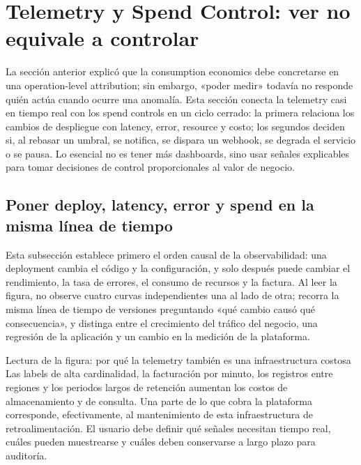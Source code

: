 \section{Telemetry y Spend Control: ver no equivale a controlar}

La sección anterior explicó que la consumption economics debe concretarse en una operation-level attribution; sin embargo, «poder medir» todavía no responde quién actúa cuando ocurre una anomalía. Esta sección conecta la telemetry casi en tiempo real con los spend controls en un ciclo cerrado: la primera relaciona los cambios de despliegue con latency, error, resource y costo; los segundos deciden si, al rebasar un umbral, se notifica, se dispara un webhook, se degrada el servicio o se pausa. Lo esencial no es tener más dashboards, sino usar señales explicables para tomar decisiones de control proporcionales al valor de negocio.

\subsection{Poner deploy, latency, error y spend en la misma línea de tiempo}

Esta subsección establece primero el orden causal de la observabilidad: una deployment cambia el código y la configuración, y solo después puede cambiar el rendimiento, la tasa de errores, el consumo de recursos y la factura. Al leer la figura, no observe cuatro curvas independientes una al lado de otra; recorra la misma línea de tiempo de versiones preguntando «qué cambio causó qué consecuencia», y distinga entre el crecimiento del tráfico del negocio, una regresión de la aplicación y un cambio en la medición de la plataforma.


\begin{knowledgebox}{Lectura de la figura: por qué la telemetry también es una infraestructura costosa}
Las labels de alta cardinalidad, la facturación por minuto, los registros entre regiones y los periodos largos de retención aumentan los costos de almacenamiento y de consulta. Una parte de lo que cobra la plataforma corresponde, efectivamente, al mantenimiento de esta infraestructura de retroalimentación. El usuario debe definir qué señales necesitan tiempo real, cuáles pueden muestrearse y cuáles deben conservarse a largo plazo para auditoría.
\end{knowledgebox}

